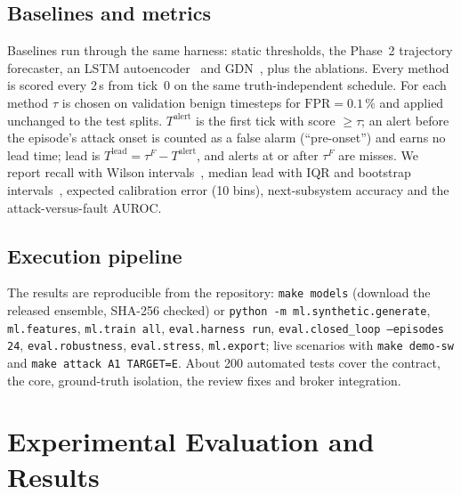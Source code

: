 \documentclass[conference]{IEEEtran}
\begin{document}
\subsection{Baselines and metrics}
Baselines run through the same harness: static thresholds, the Phase~2 trajectory forecaster, an LSTM
autoencoder~\cite{malhotra2016lstmed} and GDN~\cite{deng2021gdn}, plus the ablations. Every method is
scored every 2\,s from tick~0 on the same truth-independent schedule. For each method $\tau$ is chosen
on validation benign timesteps for $\mathrm{FPR}=0.1\,\%$ and applied unchanged to the test splits.
$T^{\mathrm{alert}}$ is the first tick with score $\ge\tau$; an alert before the episode's attack onset is
counted as a false alarm (``pre-onset'') and earns no lead time; lead is
$T^{\mathrm{lead}}=\tau^F-T^{\mathrm{alert}}$, and alerts at or after $\tau^F$ are misses. We report
recall with Wilson intervals~\cite{wilson1927}, median lead with IQR and bootstrap
intervals~\cite{efron1979bootstrap}, expected calibration error (10 bins), next-subsystem accuracy and
the attack-versus-fault AUROC.

\subsection{Execution pipeline}
The results are reproducible from the repository:
\texttt{make models} (download the released ensemble, SHA-256 checked) or
\texttt{python -m ml.synthetic.generate}, \texttt{ml.features}, \texttt{ml.train all},
\texttt{eval.harness run}, \texttt{eval.closed\_loop --episodes 24}, \texttt{eval.robustness},
\texttt{eval.stress}, \texttt{ml.export}; live scenarios with \texttt{make demo-sw} and
\texttt{make attack A1 TARGET=E}. About 200 automated tests cover the contract, the core, ground-truth
isolation, the review fixes and broker integration.

\section{Experimental Evaluation and Results}
\label{sec:results}
\end{document}
